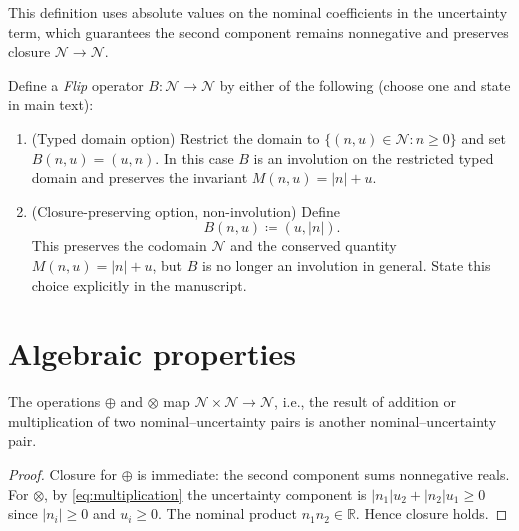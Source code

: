 \documentclass[11pt]{amsart}
\begin{document}
\noindent This definition uses absolute values on the nominal coefficients in the uncertainty term, which guarantees the second component remains nonnegative and preserves closure $\mathcal{N}\to\mathcal{N}$.

\begin{definition}\label{def:flip}
Define a \emph{Flip} operator $B:\mathcal{N}\to\mathcal{N}$ by either of the following (choose one and state in main text):

\begin{enumerate}
\item (Typed domain option) Restrict the domain to $\{(n,u)\in\mathcal{N}:n\ge 0\}$ and set $B(n,u)=(u,n)$. In this case $B$ is an involution on the restricted typed domain and preserves the invariant $M(n,u)=|n|+u$.
\item (Closure-preserving option, non-involution) Define
\begin{equation}\label{eq:flip_abs}
B(n,u)\coloneqq (u,|n|).
\end{equation}
This preserves the codomain $\mathcal{N}$ and the conserved quantity $M(n,u)=|n|+u$, but $B$ is no longer an involution in general. State this choice explicitly in the manuscript.
\end{enumerate}
\end{definition}

\section{Algebraic properties}

\begin{theorem}[Closure]\label{thm:closure}
The operations $\oplus$ and $\otimes$ map $\mathcal{N}\times\mathcal{N}\to\mathcal{N}$, i.e., the result of addition or multiplication of two nominal--uncertainty pairs is another nominal--uncertainty pair.
\end{theorem}
\begin{proof}
Closure for $\oplus$ is immediate: the second component sums nonnegative reals. For $\otimes$, by \eqref{eq:multiplication} the uncertainty component is $|n_1|u_2+|n_2|u_1\ge 0$ since $|n_i|\ge 0$ and $u_i\ge0$. The nominal product $n_1n_2\in\mathbb{R}$. Hence closure holds.
\end{proof}
\end{document}
